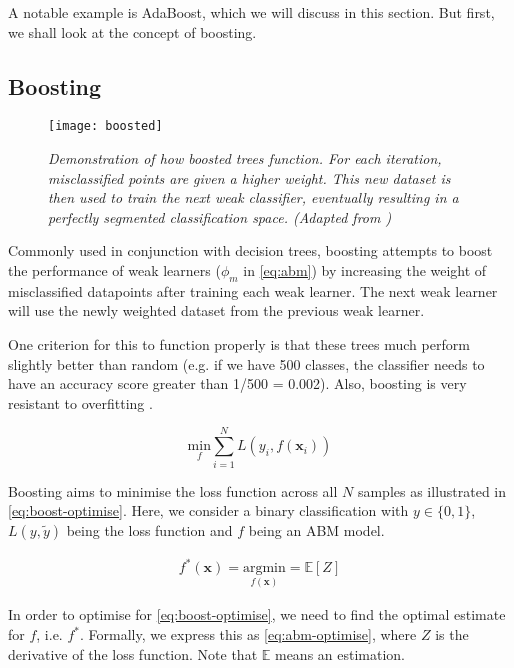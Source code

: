 A notable example is AdaBoost, which we will discuss in this section. But first, we shall look at the concept of boosting. 

\subsection{Boosting}
\begin{figure}[H]
  \centering
  \texttt{[image: boosted]}
  \caption{\textit{Demonstration of how boosted trees function. For each iteration, misclassified points are given a higher weight. This new dataset is then used to train the next weak classifier, eventually resulting in a perfectly segmented classification space. (Adapted from \protect{})}}
  \label{fig:boosted}
\end{figure}

Commonly used in conjunction with decision trees, boosting attempts to boost the performance of weak learners ($\phi_m$ in \autoref{eq:abm}) by increasing the weight of misclassified datapoints after training each weak learner\cite{boosting}. The next weak learner will use the newly weighted dataset from the previous weak learner.

One criterion for this to function properly is that these trees much perform slightly better than random (e.g. if we have 500 classes, the classifier needs to have an accuracy score greater than 1/500 = 0.002). Also, boosting is very resistant to overfitting \cite{mur-book}.

\begin{equation} \label{eq:boost-optimise}
  \underset{f}{\mathrm{min}} \sum_{i=1}^{N} L(y_i, f(\mathbf{x}_i))
\end{equation}

Boosting aims to minimise the loss function across all $N$ samples as illustrated in \autoref{eq:boost-optimise}. Here, we consider a binary classification with $y \in \{0,1\}$, $L(y, \tilde{y})$ being the loss function and $f$ being an ABM model.

\begin{align} \label{eq:abm-optimise}
  f^{*}(\mathbf{x}) = \underset{f(\mathbf{x})}{\mathrm{argmin}} = \mathbb{E}[Z]
\end{align}

In order to optimise for \autoref{eq:boost-optimise}, we need to find the optimal estimate for $f$, i.e. $f^{*}$. Formally, we express this as \autoref{eq:abm-optimise}, where $Z$ is the derivative of the loss function. Note that $\mathbb{E}$ means an estimation.

